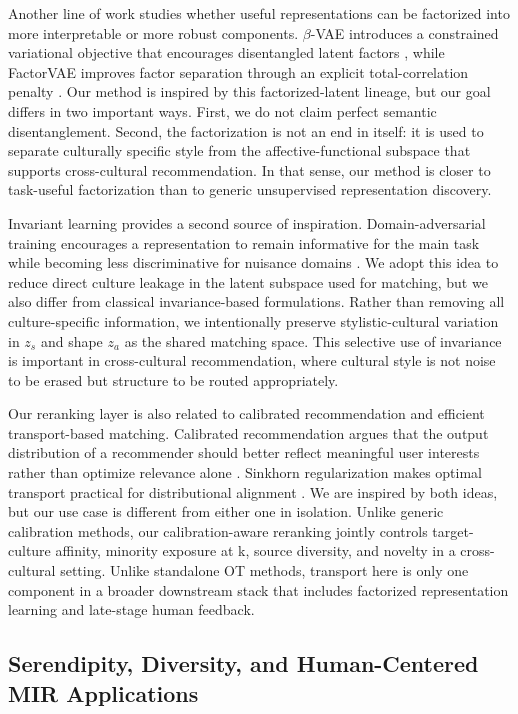 Another line of work studies whether useful representations can be factorized into more interpretable or more robust components. \(\beta\)-VAE introduces a constrained variational objective that encourages disentangled latent factors \cite{higgins2017betavae}, while FactorVAE improves factor separation through an explicit total-correlation penalty \cite{kim2018factorvae}. Our method is inspired by this factorized-latent lineage, but our goal differs in two important ways. First, we do not claim perfect semantic disentanglement. Second, the factorization is not an end in itself: it is used to separate culturally specific style from the affective-functional subspace that supports cross-cultural recommendation. In that sense, our method is closer to task-useful factorization than to generic unsupervised representation discovery.

Invariant learning provides a second source of inspiration. Domain-adversarial training encourages a representation to remain informative for the main task while becoming less discriminative for nuisance domains \cite{ganin2016dann}. We adopt this idea to reduce direct culture leakage in the latent subspace used for matching, but we also differ from classical invariance-based formulations. Rather than removing all culture-specific information, we intentionally preserve stylistic-cultural variation in \(z_s\) and shape \(z_a\) as the shared matching space. This selective use of invariance is important in cross-cultural recommendation, where cultural style is not noise to be erased but structure to be routed appropriately.

Our reranking layer is also related to calibrated recommendation and efficient transport-based matching. Calibrated recommendation argues that the output distribution of a recommender should better reflect meaningful user interests rather than optimize relevance alone \cite{steck2018calibrated}. Sinkhorn regularization makes optimal transport practical for distributional alignment \cite{cuturi2013sinkhorn}. We are inspired by both ideas, but our use case is different from either one in isolation. Unlike generic calibration methods, our calibration-aware reranking jointly controls target-culture affinity, minority exposure at k, source diversity, and novelty in a cross-cultural setting. Unlike standalone OT methods, transport here is only one component in a broader downstream stack that includes factorized representation learning and late-stage human feedback.

\subsection{Serendipity, Diversity, and Human-Centered MIR Applications}

